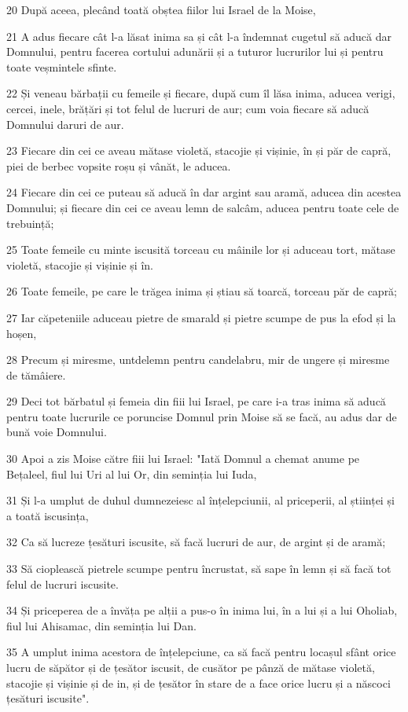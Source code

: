 \par 20 După aceea, plecând toată obștea fiilor lui Israel de la Moise,
\par 21 A adus fiecare cât l-a lăsat inima sa și cât l-a îndemnat cugetul să aducă dar Domnului, pentru facerea cortului adunării și a tuturor lucrurilor lui și pentru toate veșmintele sfinte.
\par 22 Și veneau bărbații cu femeile și fiecare, după cum îl lăsa inima, aducea verigi, cercei, inele, brățări și tot felul de lucruri de aur; cum voia fiecare să aducă Domnului daruri de aur.
\par 23 Fiecare din cei ce aveau mătase violetă, stacojie și vișinie, în și păr de capră, piei de berbec vopsite roșu și vânăt, le aducea.
\par 24 Fiecare din cei ce puteau să aducă în dar argint sau aramă, aducea din acestea Domnului; și fiecare din cei ce aveau lemn de salcâm, aducea pentru toate cele de trebuință;
\par 25 Toate femeile cu minte iscusită torceau cu mâinile lor și aduceau tort, mătase violetă, stacojie și vișinie și în.
\par 26 Toate femeile, pe care le trăgea inima și știau să toarcă, torceau păr de capră;
\par 27 Iar căpeteniile aduceau pietre de smarald și pietre scumpe de pus la efod și la hoșen,
\par 28 Precum și miresme, untdelemn pentru candelabru, mir de ungere și miresme de tămâiere.
\par 29 Deci tot bărbatul și femeia din fiii lui Israel, pe care i-a tras inima să aducă pentru toate lucrurile ce poruncise Domnul prin Moise să se facă, au adus dar de bună voie Domnului.
\par 30 Apoi a zis Moise către fiii lui Israel: "Iată Domnul a chemat anume pe Bețaleel, fiul lui Uri al lui Or, din seminția lui Iuda,
\par 31 Și l-a umplut de duhul dumnezeiesc al înțelepciunii, al priceperii, al științei și a toată iscusința,
\par 32 Ca să lucreze țesături iscusite, să facă lucruri de aur, de argint și de aramă;
\par 33 Să cioplească pietrele scumpe pentru încrustat, să sape în lemn și să facă tot felul de lucruri iscusite.
\par 34 Și priceperea de a învăța pe alții a pus-o în inima lui, în a lui și a lui Oholiab, fiul lui Ahisamac, din seminția lui Dan.
\par 35 A umplut inima acestora de înțelepciune, ca să facă pentru locașul sfânt orice lucru de săpător și de țesător iscusit, de cusător pe pânză de mătase violetă, stacojie și vișinie și de in, și de țesător în stare de a face orice lucru și a născoci țesături iscusite".

